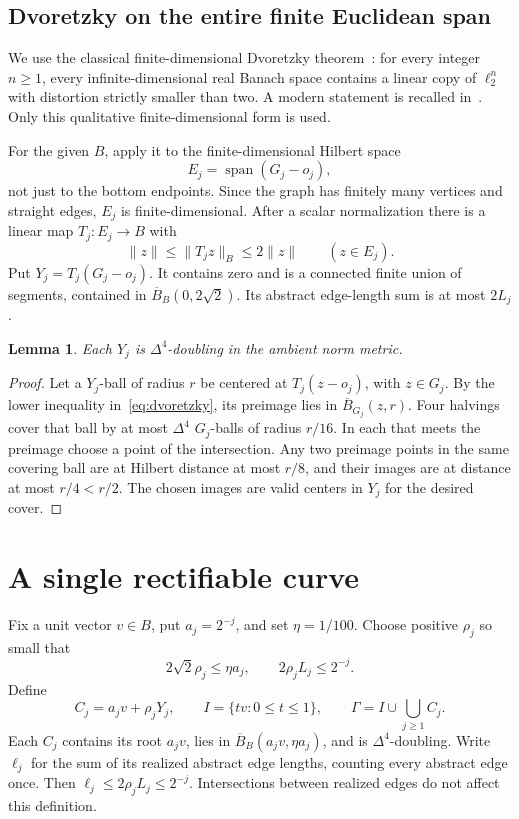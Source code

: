 \documentclass[11pt,a4paper]{article}
\newtheorem{lemma}[theorem]{Lemma}
\theoremstyle{definition}
\theoremstyle{remark}
\numberwithin{equation}{section}
\newcommand{\norm}[1]{\lVert #1\rVert}
\newcommand{\cB}{\overline B}
\begin{document}
\subsection{Dvoretzky on the entire finite Euclidean span}
We use the classical finite-dimensional Dvoretzky theorem~\cite[Section~7]{Dvoretzky}: for every integer $n\ge1$, every infinite-dimensional real Banach space contains a linear copy of $\ell_2^n$ with distortion strictly smaller than two. A modern statement is recalled in~\cite[Theorem~1.1]{COO}. Only this qualitative finite-dimensional form is used.

For the given $B$, apply it to the finite-dimensional Hilbert space
\[
 E_j=\operatorname{span}(G_j-o_j),
\]
not just to the bottom endpoints. Since the graph has finitely many vertices and straight edges, $E_j$ is finite-dimensional. After a scalar normalization there is a linear map $T_j:E_j\to B$ with
\begin{equation}\label{eq:dvoretzky}
 \norm z\le\norm{T_jz}_B\le2\norm z\qquad(z\in E_j).
\end{equation}
Put $Y_j=T_j(G_j-o_j)$. It contains zero and is a connected finite union of segments, contained in $\cB_B(0,2\sqrt2)$. Its abstract edge-length sum is at most $2L_j$.

\begin{lemma}\label{lem:transfer}
Each $Y_j$ is $\Delta^4$-doubling in the ambient norm metric.
\end{lemma}
\begin{proof}
Let a $Y_j$-ball of radius $r$ be centered at $T_j(z-o_j)$, with $z\in G_j$. By the lower inequality in~\eqref{eq:dvoretzky}, its preimage lies in $\cB_{G_j}(z,r)$. Four halvings cover that ball by at most $\Delta^4$ $G_j$-balls of radius $r/16$. In each that meets the preimage choose a point of the intersection. Any two preimage points in the same covering ball are at Hilbert distance at most $r/8$, and their images are at distance at most $r/4<r/2$. The chosen images are valid centers in $Y_j$ for the desired cover.
\end{proof}

\section{A single rectifiable curve}
Fix a unit vector $v\in B$, put $a_j=2^{-j}$, and set $\eta=1/100$. Choose positive $\rho_j$ so small that
\begin{equation}\label{eq:scales}
 2\sqrt2\rho_j\le\eta a_j,
 \qquad 2\rho_jL_j\le2^{-j}.
\end{equation}
Define
\[
 C_j=a_jv+\rho_jY_j,\qquad I=\{tv:0\le t\le1\},
 \qquad \Gamma=I\cup\bigcup_{j\ge1}C_j.
\]
Each $C_j$ contains its root $a_jv$, lies in $\cB_B(a_jv,\eta a_j)$, and is $\Delta^4$-doubling. Write $\ell_j$ for the sum of its realized abstract edge lengths, counting every abstract edge once. Then $\ell_j\le2\rho_jL_j\le2^{-j}$. Intersections between realized edges do not affect this definition.
\end{document}
